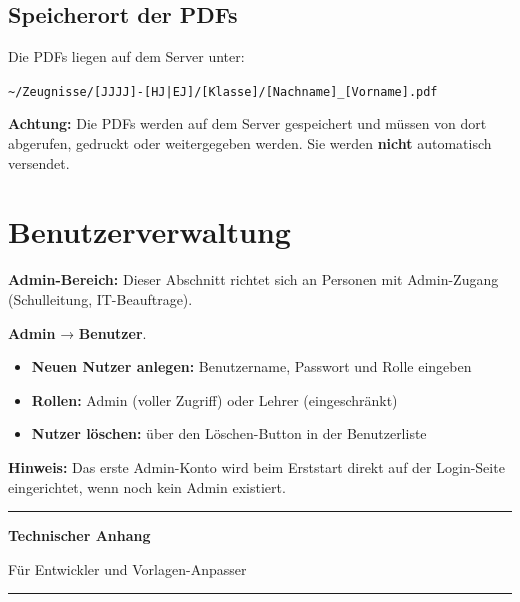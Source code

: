 \documentclass[12pt,a4paper]{article}
\newcommand{\info}[1]{\begin{infobox}\textbf{Hinweis:} #1\end{infobox}}
\newcommand{\warn}[1]{\begin{warnbox}\textbf{Achtung:} #1\end{warnbox}}
\newcommand{\adminonly}{\begin{adminbox}\textbf{Admin-Bereich:}
Dieser Abschnitt richtet sich an Personen mit Admin-Zugang (Schulleitung, IT-Beauftrage).\end{adminbox}}
\newcommand{\menu}[1]{\textbf{\textcolor{primary}{#1}}}
\begin{document}
\subsection{Speicherort der PDFs}
Die PDFs liegen auf dem Server unter:
\begin{center}
\texttt{\textasciitilde/Zeugnisse/[JJJJ]-[HJ|EJ]/[Klasse]/[Nachname]\_[Vorname].pdf}
\end{center}

\warn{Die PDFs werden auf dem Server gespeichert und müssen von dort
abgerufen, gedruckt oder weitergegeben werden.
Sie werden \textbf{nicht} automatisch versendet.}

\section{Benutzerverwaltung}

\adminonly

\menu{Admin} → \menu{Benutzer}.

\begin{itemize}[noitemsep]
  \item \textbf{Neuen Nutzer anlegen:} Benutzername, Passwort und Rolle eingeben
  \item \textbf{Rollen:} Admin (voller Zugriff) oder Lehrer (eingeschränkt)
  \item \textbf{Nutzer löschen:} über den Löschen-Button in der Benutzerliste
\end{itemize}

\info{Das erste Admin-Konto wird beim Erststart direkt auf der Login-Seite
eingerichtet, wenn noch kein Admin existiert.}

\newpage

{%
  \centering
  \vspace{2em}
  {\color{gray}\rule{\linewidth}{1pt}}\par\vspace{0.5em}
  {\large\bfseries\color{gray} Technischer Anhang}\par
  \vspace{0.3em}
  {\normalsize\color{gray} Für Entwickler und Vorlagen-Anpasser}\par
  \vspace{0.5em}
  {\color{gray}\rule{\linewidth}{1pt}}\par
  \vspace{2em}
}
\end{document}
